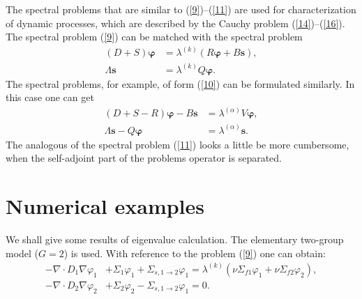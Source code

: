 \documentclass[authoryear]{elsarticle}
\begin{document}
The spectral problems that are similar to (\ref{9})--(\ref{11}) are used for characterization of dynamic processes, which are described by the Cauchy problem (\ref{14})--(\ref{16}). The spectral problem (\ref{9}) can be matched with the spectral problem
\[
\begin{split}
 (D+S) \bm \varphi  & = \lambda^{(k)} \left ( R \bm \varphi  +  B \bm s \right ) , \\
 \Lambda \bm s & =  \lambda^{(k)} Q \bm \varphi .
\end{split}
\] 
The spectral problems, for example, of form (\ref{10}) can be formulated similarly. In this case one can get 
\[
\begin{split}
 (D+S - R) \bm \varphi  -  B \bm s & = \lambda^{(\alpha)} V \bm \varphi , \\
 \Lambda \bm s - Q \bm \varphi & =  \lambda^{(\alpha)}   \bm s .
\end{split}
\]
The analogous of the spectral problem (\ref{11}) looks a little be more cumbersome, when the self-adjoint part of the problems operator is separated. 

\section{Numerical examples} 

We shall give some results of eigenvalue calculation. The elementary two-group model ($G = 2$) is used. With reference to the problem  (\ref{9}) 
one can obtain:
\begin{equation}\label{17}
\begin{split}
 - \nabla \cdot D_1 \nabla \varphi_1 & + \Sigma_1 \varphi_1 + \Sigma_{s,1\rightarrow 2} \varphi_1  
 = \lambda^{(k)} (\nu \Sigma_{f1} \varphi_1 + \nu \Sigma_{f2} \varphi_2), \\
 - \nabla \cdot D_2 \nabla \varphi_2 & + \Sigma_2 \varphi_2 - \Sigma_{s,1\rightarrow 2} \varphi_1  
 = 0.
\end{split}
\end{equation}
\end{document}
